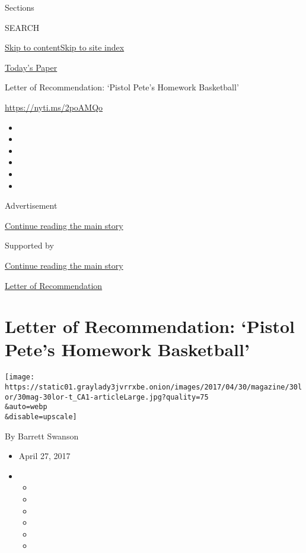 Sections

SEARCH

\protect\hyperlink{site-content}{Skip to
content}\protect\hyperlink{site-index}{Skip to site index}

\href{https://myaccount.nytimes3xbfgragh.onion/auth/login?response_type=cookie\&client_id=vi}{}

\href{https://www.nytimes3xbfgragh.onion/section/todayspaper}{Today's
Paper}

Letter of Recommendation: `Pistol Pete's Homework Basketball'

\url{https://nyti.ms/2poAMQo}

\begin{itemize}
\item
\item
\item
\item
\item
\item
\end{itemize}

Advertisement

\protect\hyperlink{after-top}{Continue reading the main story}

Supported by

\protect\hyperlink{after-sponsor}{Continue reading the main story}

\href{/column/letter-of-recommendation}{Letter of Recommendation}

\hypertarget{letter-of-recommendation-pistol-petes-homework-basketball}{%
\section{Letter of Recommendation: `Pistol Pete's Homework
Basketball'}\label{letter-of-recommendation-pistol-petes-homework-basketball}}

\texttt{[image: https://static01.graylady3jvrrxbe.onion/images/2017/04/30/magazine/30lor/30mag-30lor-t\_CA1-articleLarge.jpg?quality=75\\\&auto=webp\\\&disable=upscale]}

By Barrett Swanson

\begin{itemize}
\item
  April 27, 2017
\item
  \begin{itemize}
  \item
  \item
  \item
  \item
  \item
  \item
  \end{itemize}
\end{itemize}

